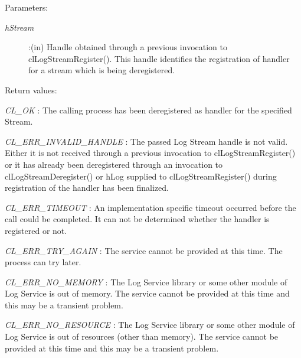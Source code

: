 \begin{flushleft}
\begin{Desc}
\begin{verbatim}
\end{verbatim}
\normalsize
\end{Desc}
\begin{Desc}
\item[Parameters:] \begin{description}
\item[{\em hStream}]:(in) Handle obtained through a previous invocation to clLogStreamRegister(). This handle identifies the registration of handler
for a stream which is being deregistered.
\end{description}
\end{Desc}
\begin{Desc}
\item[Return values:]
\item[{\em CL\_\-OK}]: The calling process has been deregistered as handler for the specified Stream.
\item[{\em CL\_\-ERR\_\-INVALID\_\-HANDLE}]: The passed Log Stream handle is not valid. Either it is not received through a previous invocation to 
clLogStreamRegister() or it has already been deregistered through an invocation to clLogStreamDeregister() or hLog supplied to clLogStreamRegister() 
during registration of the handler has been finalized.
\item[{\em CL\_\-ERR\_\-TIMEOUT}]: An implementation specific timeout occurred before the call could be completed. It can not be determined whether the
handler is registered or not.
\item[{\em CL\_\-ERR\_\-TRY\_\-AGAIN}]: The service cannot be provided at this time. The process can try later.
\item[{\em CL\_\-ERR\_\-NO\_\-MEMORY}]: The Log Service library or some other module of Log Service is out of memory. The service cannot 
be provided at this time and this may be a transient problem.
\item[{\em CL\_\-ERR\_\-NO\_\-RESOURCE}]: The Log Service library or some other module of Log Service is out of resources 
(other than memory). The service cannot be provided at this time and this may be a transient problem.


\end{Desc}
\end{flushleft}
